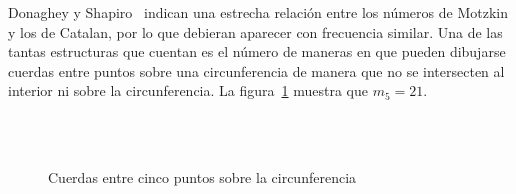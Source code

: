   Donaghey y Shapiro~\cite{donaghey77:_motzkin_numbers}
  indican una estrecha relación entre los números de Motzkin
  y los de Catalan,
  por lo que debieran aparecer con frecuencia similar.
  Una de las tantas estructuras que cuentan
  es el número de maneras en que pueden dibujarse cuerdas
  entre puntos sobre una circunferencia
  de manera que no se intersecten al interior ni sobre la circunferencia.
  La figura~\ref{fig:Motzkin} muestra que \(m_5 = 21\).
  \begin{figure}[ht]
    \centering
    \hspace{1em}
    \hspace{1em}
    \hspace{1em}
    \hspace{1em}
    \hspace{1em}
    \hspace{1em}
    \\
    \hspace{1em}
    \hspace{1em}
    \hspace{1em}
    \hspace{1em}
    \hspace{1em}
    \hspace{1em}
    \\
    \hspace{1em}
    \hspace{1em}
    \hspace{1em}
    \hspace{1em}
    \hspace{1em}
    \hspace{1em}
    \caption{Cuerdas entre cinco puntos sobre la circunferencia}
    \label{fig:Motzkin}
  \end{figure}
